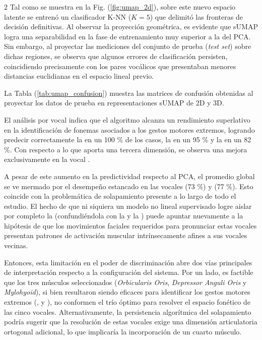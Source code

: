 \documentclass[11pt, letterpaper]{article}
\begin{document}
\begin{multicols*}{2}
Tal como se muestra en la Fig. (\ref{fig:umap_2d}), sobre este nuevo espacio latente se entrenó un clasificador K-NN ($K=5$) que delimitó las fronteras de decisión definitivas. Al observar la proyección geométrica, es evidente que sUMAP logra una separabilidad en la fase de entrenamiento muy superior a la del PCA. Sin embargo, al proyectar las mediciones del conjunto de prueba (\textit{test set}) sobre dichas regiones, se observa que algunos errores de clasificación persisten, coincidiendo precisamente con los pares vocálicos que presentaban menores distancias euclidianas en el espacio lineal previo.

La Tabla (\ref{tab:umap_confusion}) muestra las matrices de confusión obtenidas al proyectar los datos de prueba en representaciones sUMAP de 2D y 3D.

El análisis por vocal indica que el algoritmo alcanza un rendimiento superlativo en la identificación de fonemas asociados a los gestos motores extremos, logrando predecir correctamente la  en un 100 \% de los casos, la  en un 95 \% y la  en un 82 \%. Con respecto a lo que aporta una tercera dimensión, se observa una mejora exclusivamente en la vocal .

A pesar de este aumento en la predictividad respecto al PCA, el promedio global se ve mermado por el desempeño estancado en las vocales  (73 \%) y  (77 \%). Esto coincide con la problemática de solapamiento presente a lo largo de todo el estudio. El hecho de que ni siquiera un modelo no lineal supervisado logre aislar por completo la  (confundiéndola con la  y la ) puede apuntar nuevamente a la hipótesis de que los movimientos faciales requeridos para pronunciar estas vocales  presentan patrones de activación muscular intrínsecamente afines a sus vocales vecinas.

Entonces, esta limitación en el poder de discriminación abre dos vías principales de interpretación respecto a la configuración del sistema. Por un lado, es factible que los tres músculos seleccionados (\textit{Orbicularis Oris}, \textit{Depressor Anguli Oris} y \textit{Mylohyoid}), si bien resultaron siendo eficaces para identificar los gestos motores extremos (,  y ), no conformen el trío óptimo para resolver el espacio fonético de las cinco vocales. Alternativamente, la persistencia algorítmica del solapamiento podría sugerir que la resolución de estas vocales exige una dimensión articulatoria ortogonal adicional, lo que implicaría la incorporación de un cuarto músculo.


\end{multicols*}
\end{document}
